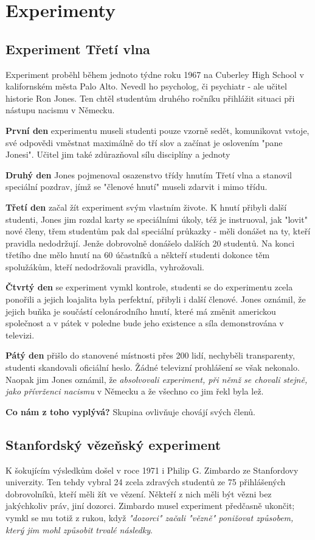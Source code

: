 \documentclass[a4paper,12pt,final]{report}
\begin{document}
\pagelogos
\section[Experimenty]{Experimenty}
\subsection[Experiment Třetí vlna]{Experiment Třetí vlna}
\label{Experiment-Treti-Vlna}
Experiment proběhl během jednoto týdne roku 1967 na Cuberley High School v kalifornském města Palo Alto. Nevedl ho psycholog, či psychiatr - ale učitel historie Ron Jones. Ten chtěl studentům druhého ročníku přihlážit situaci při nástupu nacismu v Německu.

\textbf{První den} experimentu museli studenti pouze vzorně sedět, komunikovat vstoje, své odpovědi vměstnat maximálně do tří slov a začínat je oslovením "pane Jonesi". Učitel jim také zdůrazňoval sílu disciplíny a jednoty

\textbf{Druhý den} Jones pojmenoval osazenstvo třídy hnutím Třetí vlna a stanovil speciální pozdrav, jímž se "členové hnutí" museli zdarvit i mimo třídu.

\textbf{Třetí den} začal žít experiment svým vlastním živote. K hnutí přibyli další studenti, Jones jim rozdal karty se speciálními úkoly, též je instruoval, jak "lovit" nové členy, třem studentům pak dal speciální průkazky - měli donášet na ty, kteří pravidla nedodržují. Jenže dobrovolně donášelo dalších 20 studentů. Na konci třetího dne mělo hnutí na 60 účastníků a někteří studenti dokonce těm spolužákům, kteří nedodržovali pravidla, vyhrožovali.

\textbf{Čtvrtý den} se experiment vymkl kontrole, studenti se do experimentu zcela ponořili a jejich loajalita byla perfektní, přibyli i další členové. Jones oznámil, že jejich buňka je součástí celonárodního hnutí, které má změnit americkou společnost a v pátek v poledne bude jeho existence a síla demonstrována v televizi.

\textbf{Pátý den} přišlo do stanovené místnosti přes 200 lidí, nechyběli transparenty, studenti skandovali oficiální heslo. Žádné televizní prohlášení se však nekonalo. Naopak jim Jones oznámil, že \textit{absolvovali experiment, při němž se chovali stejně, jako přívrženci nacismu} v Německu a že všechno co jim řekl byla lež.

\textbf{\Large \flushleft Co nám z toho vyplývá?} Skupina ovlivňuje chovájí svých členů.

\subsection[Stanfordský vězeňský experiment]{Stanfordský vězeňský experiment}
K šokujícím výsledkům došel v roce 1971 i Philip G. Zimbardo ze Stanfordovy univerzity. Ten tehdy vybral 24 zcela zdravých studentů ze 75 přihlášených dobrovolníků, kteří měli žít ve vězení. Někteří z nich měli být vězni bez jakýchkoliv práv, jiní dozorci. Zimbardo musel experiment předčasně ukončit; vymkl se mu totiž z rukou, když \textit{"dozorci" začali "vězně" ponižovat způsobem, který jim mohl způsobit trvalé následky}.
\end{document}

